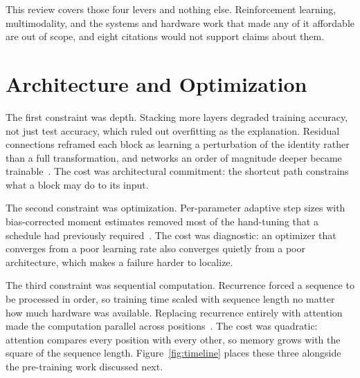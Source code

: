 \documentclass[conference]{IEEEtran}
\begin{document}
This review covers those four levers and nothing else. Reinforcement learning,
multimodality, and the systems and hardware work that made any of it affordable
are out of scope, and eight citations would not support claims about them.

\section{Architecture and Optimization}
\label{sec:architecture}

The first constraint was depth. Stacking more layers degraded training accuracy,
not just test accuracy, which ruled out overfitting as the explanation. Residual
connections reframed each block as learning a perturbation of the identity
rather than a full transformation, and networks an order of magnitude deeper
became trainable~\cite{he2015deepresiduallearningimage}. The cost was
architectural commitment: the shortcut path constrains what a block may do to
its input.

The second constraint was optimization. Per-parameter adaptive step sizes with
bias-corrected moment estimates removed most of the hand-tuning that a
schedule had previously required~\cite{kingma2017adammethodstochasticoptimization}.
The cost was diagnostic: an optimizer that converges from a poor learning rate
also converges quietly from a poor architecture, which makes a failure harder to
localize.

The third constraint was sequential computation. Recurrence forced a sequence to
be processed in order, so training time scaled with sequence length no matter how
much hardware was available. Replacing recurrence entirely with attention made
the computation parallel across positions~\cite{vaswani2023attentionneed}. The
cost was quadratic: attention compares every position with every other, so memory
grows with the square of the sequence length. Figure~\ref{fig:timeline} places
these three alongside the pre-training work discussed next.
\end{document}
